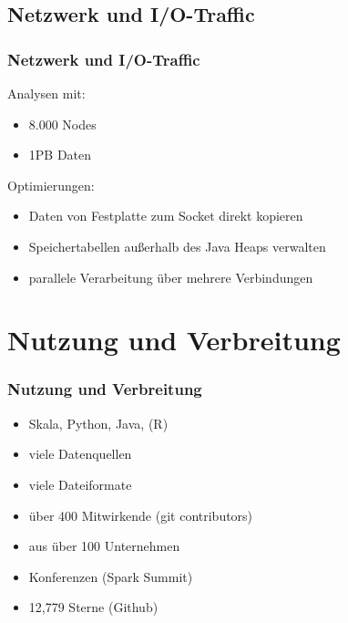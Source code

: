 \documentclass[hyperref={pdfpagelabels=false}]{beamer}
\begin{document}
 \subsection{Netzwerk und I/O-Traffic}
\begin{frame} [t]
\frametitle{Netzwerk und I/O-Traffic}
Analysen mit:
\begin{itemize}
	\item 8.000 Nodes
	\item 1PB Daten	
\end{itemize}

\vspace{0.4cm}
 {
Optimierungen:
\begin{itemize}
	\item Daten von Festplatte zum Socket direkt kopieren
	\item Speichertabellen außerhalb des Java Heaps verwalten
	\item parallele Verarbeitung über mehrere Verbindungen	
\end{itemize}
}
\end{frame}


\section{Nutzung und Verbreitung}
\begin{frame} [t]
\frametitle{Nutzung und Verbreitung}

\begin{itemize}
	\item Skala, Python, Java, (R)
	\item viele Datenquellen
	\item viele Dateiformate	
	\item über 400 Mitwirkende (git contributors)
	\item aus über 100 Unternehmen
	\item Konferenzen (Spark Summit)
	\item 12,779 Sterne (Github)
\end{itemize}

 {
	\begin{figure}[h]
		\centering
	\end{figure}
}

\end{frame}
\end{document}
